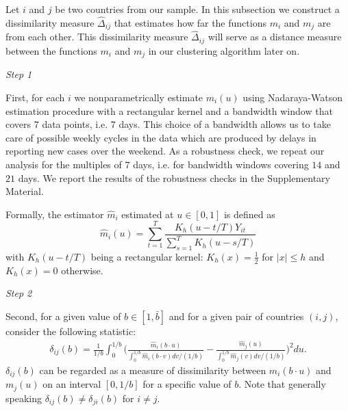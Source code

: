 \documentclass[a4paper,11pt]{article}
\numberwithin{equation}{section}
\begin{document}
Let $i$ and $j$ be two countries from our sample. In this subsection we construct a dissimilarity measure $\widehat{\Delta}_{ij}$ that estimates how far the functions $m_i$ and $m_j$ are from each other. This dissimilarity measure $\widehat{\Delta}_{ij}$ will serve as a distance measure between the functions $m_i$ and $m_j$ in our clustering algorithm later on.

\textit{Step 1}

First, for each $i$ we nonparametrically estimate $m_i(u)$ using Nadaraya-Watson estimation procedure with a rectangular kernel and a bandwidth window that covers $7$ data points, i.e. $7$ days. This choice of a bandwidth allows us to take care of possible weekly cycles in the data which are produced by delays in reporting new cases over the weekend. As a robustness check, we repeat our analysis for the multiples of $7$ days, i.e. for bandwidth windows covering $14$ and $21$ days. We report the results of the robustness checks in the Supplementary Material.

Formally, the estimator $\hat{m}_i$ estimated at $u\in [0, 1]$ is defined as
$$\hat{m}_i(u) = \sum_{t=1}^T \frac{K_h(u - t/T) Y_{it}}{\sum_{s=1}^T K_h(u - s/T)}$$
with $K_h(u - t/T)$ being a rectangular kernel: $K_h(x) = \frac{1}{2}$ for $|x| \leq h$ and $K_h(x) = 0$ otherwise.

\textit{Step 2}

Second, for a given value of $b \in [1, \bar{b}]$ and for a given pair of countries $(i, j)$, consider the following statistic:
\begin{align*}
	\delta_{ij}(b) = \frac{1}{1/b} \int_0^{1/b} \bigg( \frac{\hat{m}_i (b\cdot u)}{\int_0^{1/b} \hat{m}_i(b\cdot v) dv /(1/b)}  - \frac{\hat{m}_j (u)}{\int_0^{1/b} \hat{m}_j(v) dv /(1/b)}  \bigg)^2 du.
\end{align*}
$\delta_{ij}(b)$ can be regarded as a measure of dissimilarity between $m_i(b \cdot u)$ and $m_j(u)$ on an interval $[0, 1/b]$ for a specific value of $b$. Note that generally speaking $\delta_{ij}(b) \neq \delta_{ji}(b)$ for $i \neq j$.

\end{document}
